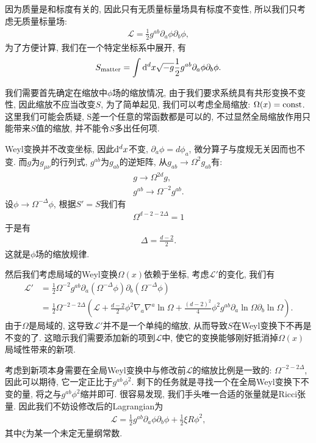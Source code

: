 因为质量是和标度有关的, 因此只有无质量标量场具有标度不变性, 所以我们只考虑无质量标量场:
\begin{align}
    \mathcal L=\frac12g^{ab}\partial_a\phi\partial_b\phi,
\end{align}
为了方便计算, 我们在一个特定坐标系中展开, 有
\begin{align}
    S_{\rm{matter}}=\int\d^dx\sqrt{-g}\frac12g^{ab}\partial_a\phi\partial_b\phi.
\end{align}

我们需要首先确定在缩放中$\phi$场的缩放情况, 由于我们要求系统具有共形变换不变性, 因此缩放不应当改变$S$, 为了简单起见, 我们可以考虑全局缩放: $\Omega(x)=\rm{const}$. 这里我们可能会质疑, S差一个任意的常函数都是可以的, 不过显然全局缩放作用只能带来$S$值的缩放, 并不能令$S$多出任何项. 

Weyl变换并不改变坐标, 因此$\d^dx$不变, $\partial_a\phi=d\phi_a$, 微分算子与度规无关因而也不变. 而$g$为$g_{\mu\nu}$的行列式, $g^{ab}$为$g_{ab}$的逆矩阵, 从$g_{ab}\to\Omega^2g_{ab}$有:
\begin{align}
    g\to\Omega^{2d}g,\\
    g^{ab}\to\Omega^{-2}g^{ab}.
\end{align}
设$\phi\to\Omega^{-\Delta}\phi$, 根据$S'=S$我们有
\begin{align}
    \Omega^{d-2-2\Delta}=1
\end{align}
于是有
\begin{align}
    \Delta=\frac{d-2}2.
\end{align}
这就是$\phi$场的缩放规律.

然后我们考虑局域的Weyl变换$\Omega(x)$依赖于坐标, 考虑$\mathcal L'$的变化, 我们有
\begin{align}
    \mathcal L'&=\frac12\Omega^{-2}g^{ab}\partial_a(\Omega^{-\Delta}\phi)\partial_b(\Omega^{-\Delta}\phi)\\
    &=\frac12\Omega^{-2-2\Delta}(\mathcal L+\frac{d-2}{2}\phi^2\nabla_a\nabla^a\ln\Omega+\frac{(d-2)^2}4\phi^2g^{ab}\partial_a\ln\Omega\partial_b\ln\Omega).
\end{align}
由于$\Omega$是局域的, 这导致$\mathcal L'$并不是一个单纯的缩放, 从而导致$S$在Weyl变换下不再是不变的了. 这暗示我们需要添加新的项到$\mathcal L$中, 使它的变换能够刚好抵消掉$\Omega(x)$局域性带来的新项. 

考虑到新项本身需要在全局Weyl变换中与修改前$\mathcal L$的缩放比例是一致的: $\Omega^{-2-2\Delta}$, 因此可以期待, 它一定正比于$g^{ab}\phi^2$. 剩下的任务就是寻找一个在全局Weyl变换下不变的量, 将之与$g^{ab}\phi^2$缩并即可. 很容易发现, 我们手头唯一合适的张量就是Ricci张量. 因此我们不妨设修改后的Lagrangian为
\begin{align}
    \mathcal L=\frac12g^{ab}\partial_a\phi\partial_b\phi+\frac12\xi R\phi^2,
\end{align}
其中$\xi$为某一个未定无量纲常数.

